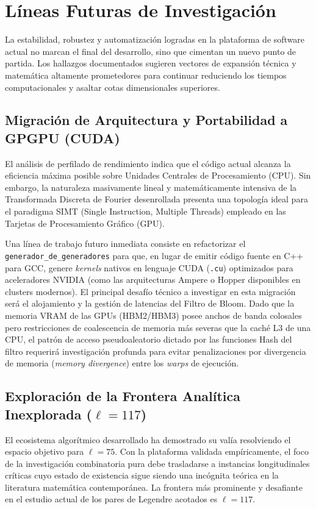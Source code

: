 \documentclass[12pt,a4paper]{tfg_domingo}
\begin{document}
\section{Líneas Futuras de Investigación}

La estabilidad, robustez y automatización logradas en la plataforma de software actual no marcan el final del desarrollo, sino que cimentan un nuevo punto de partida. Los hallazgos documentados sugieren vectores de expansión técnica y matemática altamente prometedores para continuar reduciendo los tiempos computacionales y asaltar cotas dimensionales superiores.

\subsection{Migración de Arquitectura y Portabilidad a GPGPU (CUDA)}

El análisis de perfilado de rendimiento indica que el código actual alcanza la eficiencia máxima posible sobre Unidades Centrales de Procesamiento (CPU). Sin embargo, la naturaleza masivamente lineal y matemáticamente intensiva de la Transformada Discreta de Fourier desenrollada presenta una topología ideal para el paradigma SIMT (Single Instruction, Multiple Threads) empleado en las Tarjetas de Procesamiento Gráfico (GPU).

Una línea de trabajo futuro inmediata consiste en refactorizar el \texttt{generador\_de\_generadores} para que, en lugar de emitir código fuente en C++ para GCC, genere \emph{kernels} nativos en lenguaje CUDA (\texttt{.cu}) optimizados para aceleradores NVIDIA (como las arquitecturas Ampere o Hopper disponibles en clusters modernos). El principal desafío técnico a investigar en esta migración será el alojamiento y la gestión de latencias del Filtro de Bloom. Dado que la memoria VRAM de las GPUs (HBM2/HBM3) posee anchos de banda colosales pero restricciones de coalescencia de memoria más severas que la caché L3 de una CPU, el patrón de acceso pseudoaleatorio dictado por las funciones Hash del filtro requerirá investigación profunda para evitar penalizaciones por divergencia de memoria (\emph{memory divergence}) entre los \emph{warps} de ejecución.

\subsection{Exploración de la Frontera Analítica Inexplorada ($\ell=117$)}

El ecosistema algorítmico desarrollado ha demostrado su valía resolviendo el espacio objetivo para $\ell=75$. Con la plataforma validada empíricamente, el foco de la investigación combinatoria pura debe trasladarse a instancias longitudinales críticas cuyo estado de existencia sigue siendo una incógnita teórica en la literatura matemática contemporánea. La frontera más prominente y desafiante en el estudio actual de los pares de Legendre acotados es $\ell=117$.
\end{document}
